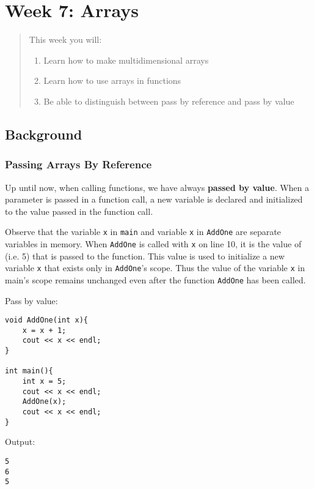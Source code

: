 \chapter*{Week 7: Arrays}
\setcounter{chapter}{8}
\setcounter{section}{0}

\begin{abstract}
This week you will:
\begin{enumerate}
    \item Learn how to make multidimensional arrays
    \item Learn how to use arrays in functions
    \item Be able to distinguish between pass by reference and pass by value

\end{enumerate}
    
\end{abstract}

\section{Background}

\subsection{Passing Arrays By Reference}
Up until now, when calling functions, we have always \textbf{passed by value}. When a parameter is passed in a function call, a new variable is declared and initialized to the value passed in the function call.

Observe that the variable \texttt{x} in \texttt{main} and variable \texttt{x} in \texttt{AddOne} are separate variables in memory. When \texttt{AddOne} is called with \texttt{x} on line 10, it is the value of \texttt{} (i.e. 5) that is passed to the function. This value is used to initialize a new variable \texttt{x} that exists only in \texttt{AddOne}'s scope. Thus the value of the variable \texttt{x} in main's scope remains unchanged even after the function \texttt{AddOne} has been called.

\begin{example} 
Pass by value:
\begin{verbatim}
void AddOne(int x){
    x = x + 1;
    cout << x << endl;
}

int main(){
    int x = 5;
    cout << x << endl;
    AddOne(x);
    cout << x << endl;
}
\end{verbatim}

Output:

\begin{verbatim}
5
6
5
\end{verbatim}
\end{example}

